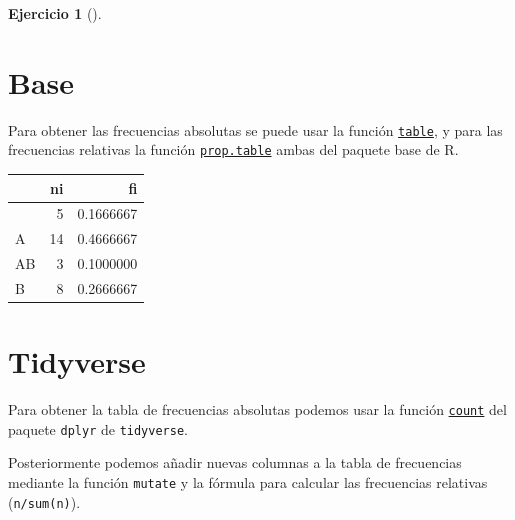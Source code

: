\documentclass[
  a4paper,
]{scrreport}
\newenvironment{Shaded}{\begin{snugshade}}{\end{snugshade}}
\newcommand{\CommentTok}[1]{\textcolor[rgb]{0.37,0.37,0.37}{#1}}
\newcommand{\FunctionTok}[1]{\textcolor[rgb]{0.28,0.35,0.67}{#1}}
\newcommand{\NormalTok}[1]{\textcolor[rgb]{0.00,0.23,0.31}{#1}}
\newcommand{\OtherTok}[1]{\textcolor[rgb]{0.00,0.23,0.31}{#1}}
\newcommand{\SpecialCharTok}[1]{\textcolor[rgb]{0.37,0.37,0.37}{#1}}
\theoremstyle{definition}
\newtheorem{exercise}{Ejercicio}[chapter]
\theoremstyle{remark}
\begin{document}
\begin{exercise}[]
\begin{enumerate}
\begin{tcolorbox}
  \section{Base}

  Para obtener las frecuencias absolutas se puede usar la función
  \href{https://www.rdocumentation.org/packages/base/versions/3.6.2/topics/table}{\texttt{table}},
  y para las frecuencias relativas la función
  \href{https://www.rdocumentation.org/packages/base/versions/3.6.2/topics/prop.table}{\texttt{prop.table}}
  ambas del paquete base de R.

\begin{Shaded}
\end{Shaded}

  \begin{longtable}[]{@{}lrr@{}}
  \toprule\noalign{}
  & ni & fi \\
  \midrule\noalign{}
  \endhead
  \bottomrule\noalign{}
  \endlastfoot
  0 & 5 & 0.1666667 \\
  A & 14 & 0.4666667 \\
  AB & 3 & 0.1000000 \\
  B & 8 & 0.2666667 \\
  \end{longtable}

  \section{Tidyverse}

  Para obtener la tabla de frecuencias absolutas podemos usar la función
  \href{https://aprendeconalf.es/manual-r/06-preprocesamiento.html\#conteo-del-n\%C3\%BAmero-de-observaciones}{\texttt{count}}
  del paquete \texttt{dplyr} de \texttt{tidyverse}.

  Posteriormente podemos añadir nuevas columnas a la tabla de
  frecuencias mediante la función \texttt{mutate} y la fórmula para
  calcular las frecuencias relativas (\texttt{n/sum(n)}).


\end{tcolorbox}
\end{enumerate}
\end{exercise}
\end{document}

